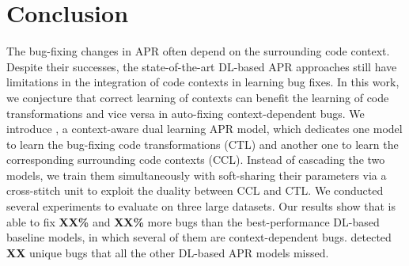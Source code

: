 \section{Conclusion}

The bug-fixing changes in APR often depend on the surrounding code
context. Despite their successes, the state-of-the-art DL-based APR
approaches still have limitations in the integration of code contexts
in learning bug fixes. In this work, we conjecture that correct
learning of contexts can benefit the learning of code transformations
and vice versa in auto-fixing context-dependent bugs. We introduce
{\tool}, a context-aware dual learning APR model, which dedicates one
model to learn the bug-fixing code transformations (CTL) and another
one to learn the corresponding surrounding code contexts
(CCL). Instead of cascading the two models, we train them
simultaneously with soft-sharing their parameters via a cross-stitch
unit to exploit the duality between CCL and CTL. We conducted several
experiments to evaluate {\tool} on three large datasets. Our results
show that {\tool} is able to fix {\bf XX\%} and {\bf XX\%} more bugs
than the best-performance DL-based baseline models, in which several
of them are context-dependent bugs. {\tool} detected {\bf XX} unique
bugs that all the other DL-based APR models missed.

